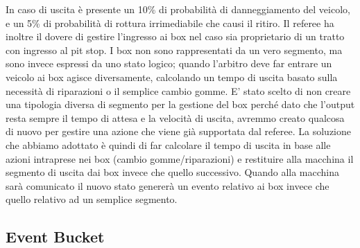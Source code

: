 In caso di uscita è presente un 10\% di probabilità di danneggiamento del veicolo, e un 5\% di probabilità di rottura irrimediabile che causi il ritiro.
Il referee ha inoltre il dovere di gestire l’ingresso ai box nel caso sia proprietario di un tratto con ingresso al pit stop. I box non sono rappresentati da un vero segmento, ma sono invece espressi da uno stato logico; quando l’arbitro deve far entrare un veicolo ai box agisce diversamente, calcolando un tempo di uscita basato sulla necessità di riparazioni o il semplice cambio gomme. E’ stato scelto di non creare una tipologia diversa di segmento per la gestione del box perché dato che l’output resta sempre il tempo di attesa e la velocità di uscita, avremmo creato qualcosa di nuovo per gestire una azione che viene già supportata dal referee. La soluzione che abbiamo adottato è quindi di far calcolare il tempo di uscita in base alle azioni intraprese nei box (cambio gomme/riparazioni) e restituire alla macchina il segmento di uscita dai box invece che quello successivo. Quando alla macchina sarà comunicato il nuovo stato genererà un evento relativo ai box invece che quello relativo ad un semplice segmento.

\subsection{Event Bucket}

